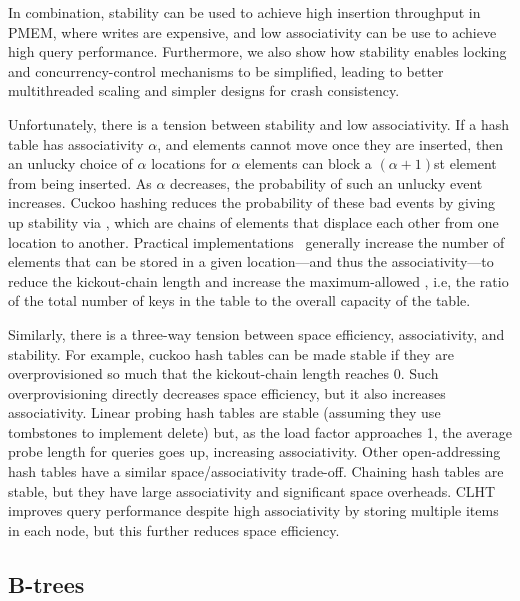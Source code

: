 In combination, stability can be used to achieve high insertion throughput in
PMEM, where writes are expensive, and low associativity can be use to achieve
high query  performance.  Furthermore, we also show how stability enables
locking and concurrency-control mechanisms to be simplified, leading to better
multithreaded scaling and simpler designs for crash consistency.

Unfortunately, there is a tension between stability and low associativity.  If a
hash table has associativity $\alpha$, and elements cannot move once they are
inserted, then an unlucky choice of $\alpha$ locations for $\alpha$ elements can
block a $(\alpha+1)$st element from being inserted.  As $\alpha$ decreases, the
probability of such an unlucky event increases.  Cuckoo hashing reduces the
probability of these bad events by giving up stability via , which are chains of elements that displace each other from one location
to another. Practical implementations~\cite{LiAn14} generally increase the
number of elements that can be stored in a given location---and thus the
associativity---to reduce the kickout-chain length and increase the
maximum-allowed , i.e, the ratio of the total number of keys
in the table to the overall capacity of the table.


Similarly, there is a three-way tension between space efficiency, associativity,
and stability.  For example, cuckoo hash tables can be made stable if they are
overprovisioned so much that the kickout-chain length reaches 0.  Such
overprovisioning directly decreases space efficiency, but it also increases
associativity.  Linear probing hash tables are stable (assuming they use
tombstones to implement delete) but, as the load factor approaches 1, the
average probe length for queries goes up, increasing associativity.  Other
open-addressing hash tables have a similar space/associativity trade-off.
Chaining hash tables are stable, but they have large associativity and
significant space overheads.  CLHT~\cite{david2015asynchronized} improves query
performance despite high associativity by storing multiple items in each node,
but this further reduces space efficiency.

\subsection{B-trees}

